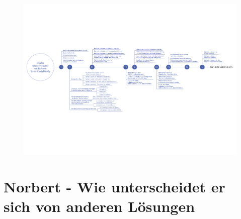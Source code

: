 \newpage
\begin{landscape}
\vspace*{35mm}
	\begin{figure}[H]
	\centering
	\includegraphics[scale=0.75]{images/timeline.pdf}
	\end{figure}

\end{landscape}
\newpage

\section{Norbert - Wie unterscheidet er sich von anderen Lösungen}

